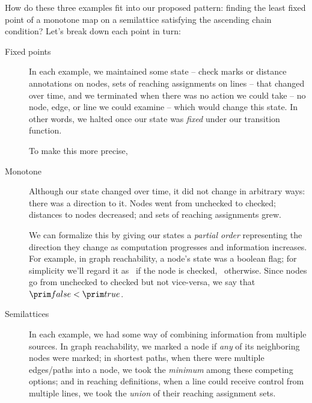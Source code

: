 \noindent
How do these three examples fit into our proposed pattern: finding the least fixed point of a monotone map on a semilattice satisfying the ascending chain condition? Let's break down each point in turn:

\begin{description}
\item[Fixed points]

  In each example, we maintained some state -- check marks or distance
  annotations on nodes, sets of reaching assignments on lines -- that changed
  over time, and we terminated when there was no action we could take -- no
  node, edge, or line we could examine -- which would change this state. In
  other words, we halted once our state was \emph{fixed} under our transition
  function.

  To make this more precise, 
  
\item[Monotone]

  Although our state changed over time, it did not change in arbitrary ways:
  there was a direction to it. Nodes went from unchecked to checked; distances
  to nodes decreased; and sets of reaching assignments grew.

  We can formalize this by giving our states a \emph{partial order} representing
  the direction they change as computation progresses and information increases.
  For example, in graph reachability, a node's state was a boolean flag; for
  simplicity we'll regard it as \etrue\ if the node is checked,
  \efalse\ otherwise. Since nodes go from unchecked to checked but not
  vice-versa, we say that $\efalse < \etrue$. \XXX

  

\item[Semilattices] In each example, we had some way of combining information
  from multiple sources. In graph reachability, we marked a node if \emph{any}
  of its neighboring nodes were marked; in shortest paths, when there were
  multiple edges/paths into a node, we took the \emph{minimum} among these
  competing options; and in reaching definitions, when a line could receive
  control from multiple lines, we took the \emph{union} of their reaching
  assignment sets.


\end{description}
